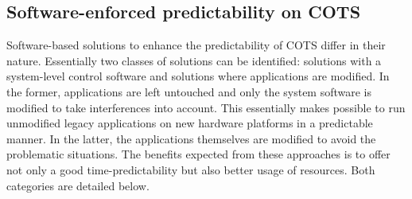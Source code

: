\documentclass[main.tex]{subfiles}
\begin{document}




\subsection{Software-enforced predictability on COTS}
\label{ssec_stateOfTheArt_softwareEnforcedPredictability}

Software-based solutions to enhance the predictability of COTS differ in their nature. Essentially two classes of solutions can be identified: solutions with a system-level control software and solutions where applications are modified. In the former, applications are left untouched and only the system software is modified to take interferences into account. This essentially makes possible to run unmodified legacy applications on new hardware platforms in a predictable manner. In the latter, the applications themselves are modified to avoid the problematic situations. The benefits expected from these approaches is to offer not only a good time-predictability but also better usage of resources. Both categories are detailed below.
\end{document}
